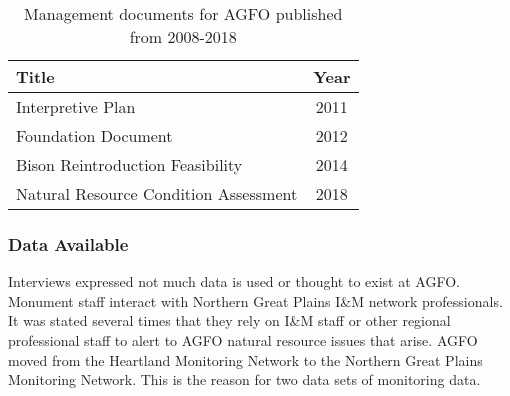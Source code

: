 \begin{table}[h]
	\centering
\caption[AGFO management documents]
	{Management documents for AGFO published from 2008-2018} 
\label{tab:AGFOManDocs}
	\begin{tabular}{lc}
		\toprule
		Title & Year\tabularnewline
		\midrule
		Interpretive Plan & 2011 \tabularnewline
		Foundation Document & 2012 \tabularnewline
		Bison Reintroduction Feasibility & 2014 \tabularnewline
		Natural Resource Condition Assessment & 2018 \tabularnewline
		\bottomrule
	\end{tabular}
\end{table}

\subsubsection{Data Available}

Interviews expressed not much data is used or thought to exist at AGFO.
Monument staff interact with Northern Great Plains I\&M network professionals. 
It was stated several times that they rely on I\&M staff or other regional professional staff to alert to AGFO natural resource issues that arise. 
AGFO moved from the Heartland Monitoring Network to the Northern Great Plains Monitoring Network. 
This is the reason for two data sets of monitoring data.

